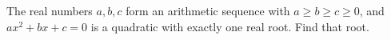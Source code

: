 The real numbers $a,b,c$ form an arithmetic sequence with $a\ge b\ge c\ge0$, and $ax^2+bx+c=0$ is a quadratic with exactly one real root. Find that root.
